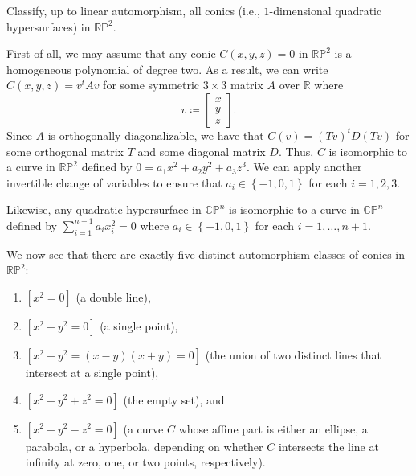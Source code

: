 \documentclass[10pt,letterpaper,cm]{nupset}
\theoremstyle{definition}
\theoremstyle{theorem}
\theoremstyle{remark}
\newcommand{\CP}{\mathbb{CP}}
\newcommand{\R}{\mathbb{R}}
\newcommand{\RP}{\mathbb{RP}}
\newcommand{\1}{\mathbb{1}}
\newcommand{\0}{\vec 0}
\newcommand{\be}{\begin{enumerate}}
\newcommand{\ee}{\end{enumerate}}
\begin{document}
\begin{problem}

Classify, up to linear automorphism, all conics	(i.e., $1$-dimensional	quadratic
hypersurfaces)	in	$\RP^2$.
\end{problem}
\begin{solution}
First of all, we may assume that any conic $C(x,y,z) =0$ in $\RP^2$ is a homogeneous polynomial of degree two. As a result, we can write  $C(x,y,z)= v^tAv$  for some symmetric $3\times 3$ matrix $A$ over $\R$ where $$v \coloneqq \begin{bmatrix} x \\ y \\ z \end{bmatrix}.$$  Since $A$ is orthogonally diagonalizable, we have that $C(v) = (Tv)^tD(Tv)$ for some orthogonal matrix $T$ and some diagonal matrix $D$.  Thus, $C$ is isomorphic to a curve in $\RP^2$ defined by $0 = a_1x^2 + a_2y^2 + a_3z^3$. We can apply another invertible change of variables to ensure that $a_i \in \left\{{-1}, 0, 1\right\}$ for each $i=1,2,3$.

\smallskip

Likewise, any quadratic hypersurface in $\CP^n$ is isomorphic to a curve in $\CP^n$ defined by $\sum_{i=1}^{n+1}a_ix_i^2 = 0$ where $a_i \in \left\{{-1}, 0, 1\right\}$ for each $i=1, \ldots, n+1$.

\medskip

We now see that there are exactly five distinct automorphism classes of conics in $\RP^2$:
\be[label=(\alph*)]
\item $\left[x^2 =0\right]$ (a double line),
\item $\left[x^2 + y^2 =0\right]$ (a single point),
\item $\left[x^2 -y^2= (x-y)(x+y)=0\right]$ (the union of two distinct lines that intersect at a single point),
\item $\left[x^2 +y^2 + z^2 =0\right]$ (the empty set), and
\item $\left[x^2 + y^2-z^2 =0\right]$ (a curve $C$ whose affine part is either an ellipse, a parabola, or a hyperbola, depending on whether $C$ intersects the line at infinity at zero, one, or two points, respectively).
\ee

\end{solution}
\end{document}
